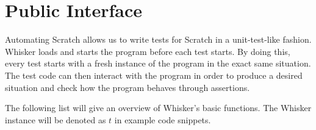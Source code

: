 \section{Public Interface}

Automating Scratch allows us to write tests for Scratch in a unit-test-like fashion.
Whisker loads and starts the program before each test starts.
By doing this, every test starts with a fresh instance of the program in the exact same situation.
The test code can then interact with the program in order to produce a desired situation and check how the program behaves through assertions.
\parspace

The following list will give an overview of Whisker's basic functions.
The Whisker instance will be denoted as $t$ in example code snippets.

